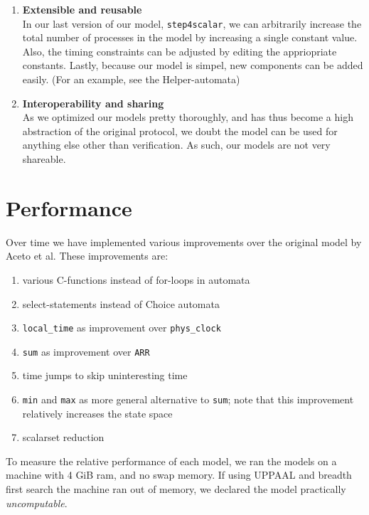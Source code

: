 \documentclass[a4paper,10pt]{article}
\newcommand{\UPPAAL}{UPPAAL\xspace}
\begin{document}
\begin{enumerate}
\item \textbf{Extensible and reusable} \\
	In our last version of our model, \texttt{step4scalar}, we can arbitrarily increase the total number of processes in the model by increasing a single constant value. Also, the timing constraints can be adjusted by editing the appriopriate constants. Lastly, because our model is simpel, new components can be added easily. (For an example, see the Helper-automata)
\item \textbf{Interoperability and sharing} \\
	As we optimized our models pretty thoroughly, and has thus become a high abstraction of the original protocol, we doubt the model can be used for anything else other than verification. As such, our models are not very shareable.
\end{enumerate}

\section{Performance\label{sec:performance}}


Over time we have implemented various improvements over the original model by Aceto et al. These improvements are:

\begin{enumerate}
\item various C-functions instead of for-loops in automata
\item select-statements instead of Choice automata
\item \texttt{local\_time} as improvement over \texttt{phys\_clock}
\item \texttt{sum} as improvement over \texttt{ARR}
\item time jumps to skip uninteresting time
\item \texttt{min} and \texttt{max} as more general alternative to \texttt{sum}; note that this improvement relatively increases the state space
\item scalarset reduction
\end{enumerate}

To measure the relative performance of each model, we ran the models on a machine with 4 GiB ram, and no swap memory. If using \UPPAAL and breadth first search the machine ran out of memory, we declared the model practically \emph{uncomputable}.
\end{document}
